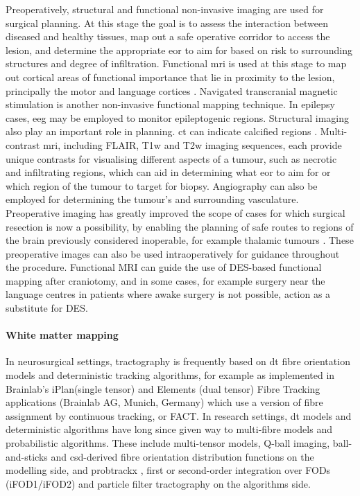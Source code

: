 Preoperatively, structural and functional non-invasive imaging are used for surgical planning.
At this stage the goal is to assess the interaction between diseased and healthy tissues, map out a safe operative corridor to access the lesion, and determine the appropriate \gls{eor} to aim for based on risk to surrounding structures and degree of infiltration.
Functional \gls{mri} is used at this stage to map out cortical areas of functional importance that lie in proximity to the lesion, principally the motor and language cortices .
Navigated transcranial magnetic stimulation is another non-invasive functional mapping technique.
In epilepsy cases, \gls{eeg} may be employed to monitor epileptogenic regions.
Structural imaging also play an important role in planning.
\Gls{ct} can indicate calcified regions .
Multi-contrast \gls{mri}, including FLAIR, T1w and T2w imaging sequences, each provide unique contrasts for visualising different aspects of a tumour, such as necrotic and infiltrating regions, which can aid in determining what \gls{eor} to aim for or which region of the tumour to target for biopsy.
Angiography  can also be employed for determining the tumour's and surrounding vasculature.
Preoperative imaging has greatly improved the scope of cases for which surgical resection is now a possibility, by enabling the planning of safe routes to regions of the brain previously considered inoperable, for example thalamic tumours .
These preoperative images can also be used intraoperatively for guidance throughout the procedure.
Functional MRI can guide the use of DES-based functional mapping after craniotomy, and in some cases, for example surgery near the language centres in patients where awake surgery is not possible, action as a substitute for DES.

\paragraph*{White matter mapping}


In neurosurgical settings, tractography is frequently based on \gls{dt} fibre orientation models \autocite{Toescu2020, Yang2021} and deterministic tracking algorithms, for example as implemented in Brainlab's iPlan\textregistered (single tensor)\autocite{Brainlab2012} and Elements (dual tensor)\autocite{Sollmann2020a} Fibre Tracking applications (Brainlab AG, Munich, Germany) which use a version of fibre assignment by continuous tracking, or FACT. \autocite{Mori1999}
In research settings, \gls{dt} models and deterministic algorithms have long since given way to multi-fibre models and probabilistic algorithms.
These include multi-tensor models,\autocite{Peled2006} Q-ball imaging\autocite{Tuch2004}, ball-and-sticks\autocite{Behrens2003} and \gls{csd}-derived fibre orientation distribution functions on the modelling side, and probtrackx \autocite{Behrens2007}, first or second-order integration over FODs (iFOD1/iFOD2)\autocite{Tournier2010} and particle filter tractography \autocite{Girard2014} on the algorithms side.

